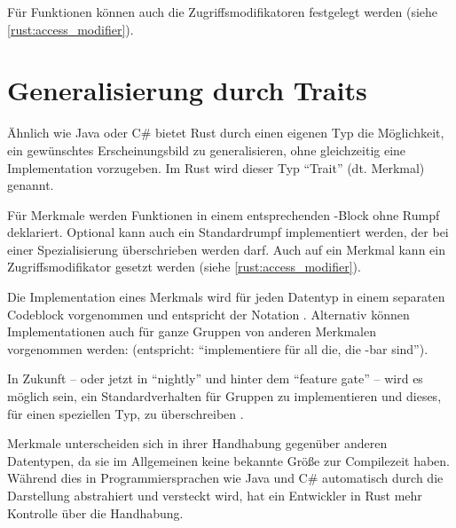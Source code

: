 Für Funktionen können auch die Zugriffsmodifikatoren festgelegt werden (siehe \autoref{rust:access_modifier}).

\section{Generalisierung durch Traits}
\label{rust:traits}
\label{rust:generics}
\label{rust:trait:default}
\label{rust:trait:drop}
\label{rust:trait:send}

Ähnlich wie Java oder C\# bietet Rust durch einen eigenen Typ die Möglichkeit, ein gewünschtes Erscheinungsbild zu generalisieren, ohne gleichzeitig eine Implementation vorzugeben.
Im Rust wird dieser Typ \enquote{Trait} (dt. Merkmal) genannt.

Für Merkmale werden Funktionen in einem entsprechenden -Block ohne Rumpf deklariert.
Optional kann auch ein Standardrumpf implementiert werden, der bei einer Spezialisierung überschrieben werden darf.
Auch auf ein Merkmal kann ein Zugriffsmodifikator gesetzt werden (siehe \autoref{rust:access_modifier}).

Die Implementation eines Merkmals wird für jeden Datentyp in einem separaten Codeblock vorgenommen und entspricht der Notation .
Alternativ können Implementationen auch für ganze Gruppen von anderen Merkmalen vorgenommen werden:  (entspricht: \enquote{implementiere  für all die, die -bar sind}).

In Zukunft -- oder jetzt in \enquote{nightly} und hinter dem \enquote{feature gate}  -- wird es möglich sein, ein Standardverhalten für Gruppen zu implementieren und dieses, für einen speziellen Typ, zu überschreiben \cite{rust:github:specialization}.

Merkmale unterscheiden sich in ihrer Handhabung gegenüber anderen Datentypen, da sie im Allgemeinen keine bekannte Größe zur Compilezeit haben.
Während dies in Programmiersprachen wie Java und C\# automatisch durch die Darstellung abstrahiert und versteckt wird, hat ein Entwickler in Rust mehr Kontrolle über die Handhabung.

